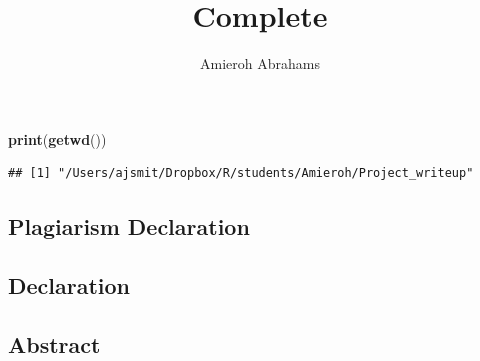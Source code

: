 \documentclass[12pt,a4paper,]{article}
\title{Complete}
\author{Amieroh Abrahams}
\date{}
\newenvironment{Shaded}{\begin{snugshade}}{\end{snugshade}}
\newcommand{\KeywordTok}[1]{\textcolor[rgb]{0.13,0.29,0.53}{\textbf{#1}}}
\newcommand{\NormalTok}[1]{#1}
\begin{document}
\maketitle

{
\setcounter{tocdepth}{4}
\tableofcontents
}
\begin{Shaded}
\begin{Highlighting}[]
\KeywordTok{print}\NormalTok{(}\KeywordTok{getwd}\NormalTok{())}
\end{Highlighting}
\end{Shaded}

\begin{verbatim}
## [1] "/Users/ajsmit/Dropbox/R/students/Amieroh/Project_writeup"
\end{verbatim}

\newpage

\hypertarget{plagiarism-declaration}{%
\subsection{Plagiarism Declaration}\label{plagiarism-declaration}}

\newpage

\hypertarget{declaration}{%
\subsection{Declaration}\label{declaration}}

\newpage

\hypertarget{abstract}{%
\subsection{Abstract}\label{abstract}}
\end{document}
